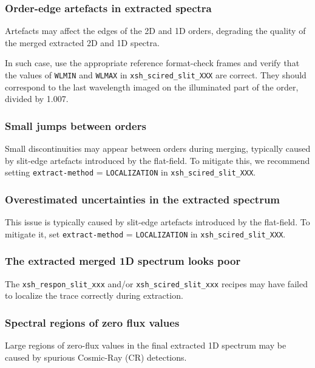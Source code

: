 \subsubsection{Order-edge artefacts in extracted spectra}

Artefacts may affect the edges of the 2D and 1D orders, 
degrading the quality of the merged extracted 2D and 1D spectra.

In such case, use the appropriate reference format-check frames 
and verify that the values of 
{\tt WLMIN} and {\tt WLMAX} in {\tt xsh\_scired\_slit\_XXX} are correct.
They should correspond to the last wavelength imaged 
on the illuminated part of the order, divided by 1.007.

\subsubsection{Small jumps between orders}

Small discontinuities may appear between orders during merging, 
typically caused by slit-edge artefacts introduced by the flat-field.
To mitigate this, we recommend setting {\tt extract-method} = {\tt LOCALIZATION} 
in {\tt xsh\_scired\_slit\_XXX}.

\subsubsection{Overestimated uncertainties in the extracted spectrum}

This issue is typically caused by slit-edge artefacts introduced by the flat-field.
To mitigate it, set {\tt extract-method} = {\tt LOCALIZATION} in {\tt xsh\_scired\_slit\_XXX}.

\subsubsection{The extracted merged 1D spectrum looks poor}

The {\tt xsh\_respon\_slit\_xxx} and/or {\tt xsh\_scired\_slit\_xxx} recipes may have
failed to localize the trace correctly during extraction.

\subsubsection{Spectral regions of zero flux values}

Large regions of zero-flux values in the final extracted 1D spectrum
may be caused by spurious Cosmic-Ray (CR) detections.

